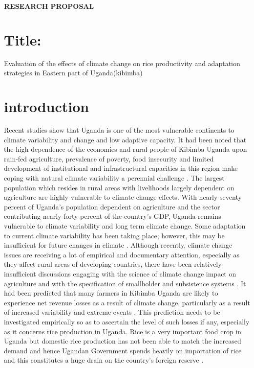 \documentclass{article}                    %
\begin{document}
 
\textbf{{ RESEARCH PROPOSAL} }  

\section{  Title: }    
Evaluation of the effects of climate change on rice productivity and adaptation strategies in Eastern part of Uganda(kibimba)
\section{ introduction}
Recent studies show that Uganda is one of the most vulnerable continents to climate variability and change and low adaptive capacity. It had been noted that the high dependence of the economies and rural people of Kibimba Uganda upon rain-fed agriculture, prevalence of poverty, food insecurity and limited development of institutional and infrastructural capacities in this region make coping with natural climate variability a perennial challenge . The largest population which resides in rural areas with livelihoods largely dependent on agriculture are highly vulnerable to climate change effects. With nearly seventy percent of Uganda's population dependent on agriculture and the sector contributing nearly forty percent of the country's GDP, Uganda remains vulnerable to climate variability and long term climate change. Some adaptation to current climate variability has been taking place; however, this may be insufficient for future changes in climate . 
Although recently, climate change issues are receiving a lot of empirical and documentary attention, especially as they affect rural areas of developing countries, there have been relatively insufficient discussions engaging with the science of climate change impact on agriculture and with the specification of smallholder and subsistence systems . It had been predicted that many farmers in Kibimba Uganda are likely to experience net revenue losses as a result of climate change, particularly as a result of increased variability and extreme events . This prediction needs to be investigated empirically so as to ascertain the level of such losses if any, especially as it concerns rice production in Uganda. Rice is a very important food crop in Uganda but domestic rice production has not been able to match the increased demand and hence Ugandan Government spends heavily on importation of rice and this constitutes a huge drain on the country's foreign reserve . 
\end{document}
